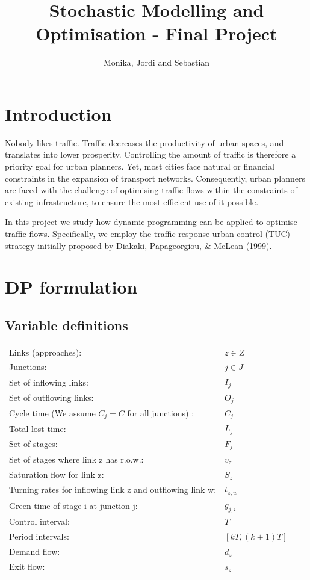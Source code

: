 \documentclass[11pt]{article}
\begin{document}
\author{Monika, Jordi and Sebastian}
\title{Stochastic Modelling and Optimisation - Final Project}
\maketitle

\medskip

\section{Introduction}
Nobody likes traffic. Traffic decreases the productivity of urban spaces, and translates into lower prosperity. Controlling the amount of traffic is therefore a priority goal for urban planners. Yet, most cities face natural or financial constraints in the expansion of transport networks. Consequently,  urban planners are faced with the challenge of optimising traffic flows within the constraints of existing infrastructure, to ensure the most efficient use of it possible.

In this project we study how dynamic programming can be applied to optimise traffic flows. Specifically, we employ the traffic response urban control (TUC) strategy initially proposed by Diakaki, Papageorgiou, & McLean (1999). 


\section{DP formulation}
\subsection{Variable definitions}
\begin{tabular}{ l l c }
Links (approaches): & $z \in Z$  &\\
Junctions: & $j \in J$ &\\
Set of inflowing links: & $I_j$ &\\
Set of outflowing links: & $O_j$ &\\
Cycle time (We assume $C_j = C$ for all junctions) : & $C_j$ & \\
Total lost time: &$L_j$ &\\
Set of stages: & $F_j$ &\\
Set of stages where link z has r.o.w.: & $v_z$ &\\
Saturation flow for link z: & $S_z$ &\\
Turning rates for inflowing link z and outflowing link w: & $t_{z,w}$ &\\
Green time of stage i at junction j: & $g_{j,i}$ &\\
Control interval: & $T$ &\\
Period intervals: & $[k T,(k+1) T]$ &\\
Demand flow: & $d_z$ &\\
Exit flow: & $ s_z $ &\\
\end{tabular}
\end{document}
